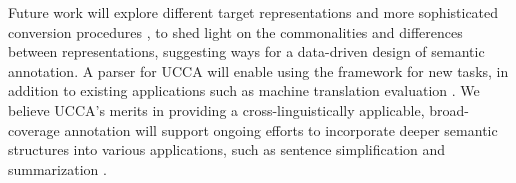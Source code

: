 \documentclass[11pt,a4paper]{article}
\begin{document}
Future work will explore different target
representations and more sophisticated conversion procedures \cite{kong-15},
to shed light on the commonalities and differences between
representations, suggesting ways for a data-driven design of semantic annotation.
A parser for UCCA will enable using the framework for new tasks,
in addition to existing applications such as machine translation
evaluation \cite{birch2016hume}.
We believe UCCA's merits in providing a cross-linguistically applicable,
broad-coverage annotation will support ongoing efforts to incorporate deeper
semantic structures into various applications,
such as sentence simplification \cite{narayan2014hybrid} and summarization \cite{liu2015toward}.



\end{document}

